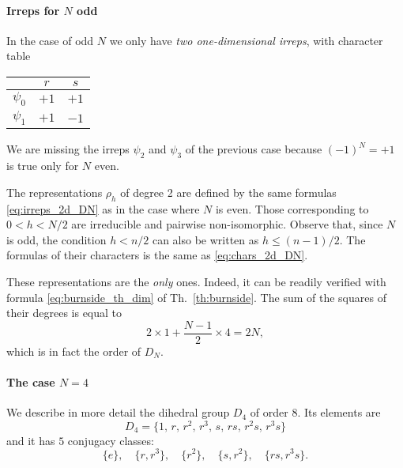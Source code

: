 \paragraph*{Irreps for $N$ odd}

In the case of odd $N$ we only have \emph{two one-dimensional irreps}, with character table

\begin{center}
    \begin{tabular}{ccc}
        \toprule
        & $r$ & $s$ \\
        \midrule
        $\psi_0$ & $+1$ & $+1$ \\
        $\psi_1$ & $+1$ & $-1$ \\
        \bottomrule
    \end{tabular}
\end{center}

We are missing the irreps $\psi_2$ and $\psi_3$ of the previous case because $(-1)^N = +1$ is true only for $N$ even.

The representations $\rho_h$ of degree 2 are defined by the same formulas \eqref{eq:irreps_2d_DN} as in the case where $N$ is even.
Those corresponding to $0 < h < N/2$ are irreducible and pairwise non-isomorphic.
Observe that, since $N$ is odd, the condition $h < n/2$ can also be written as $h \leq (n-1)/2$.
The formulas of their characters is the same as \eqref{eq:chars_2d_DN}.

These representations are the \emph{only} ones.
Indeed, it can be readily verified with formula \eqref{eq:burnside_th_dim} of Th.~\ref{th:burnside}.
The sum of the squares of their degrees is equal to
\begin{equation*}
    2 \times 1 + \frac{N-1}{2} \times 4 = 2N,
\end{equation*}
which is in fact the order of $D_N$.


\paragraph*{The case $N=4$}

We describe in more detail the dihedral group $D_4$ of order $8$.
Its elements are
\begin{equation*}
    D_4 = \{1,\, r,\, r^2,\, r^3,\, s,\, r s,\, r^2 s,\, r^3 s \}
\end{equation*}
and it has $5$ conjugacy classes:
\begin{equation*}
    \{e\}, \quad
    \{r,r^3\}, \quad
    \{r^2\}, \quad
    \{s,r^2\}, \quad
    \{rs,r^3s\}.
\end{equation*}

